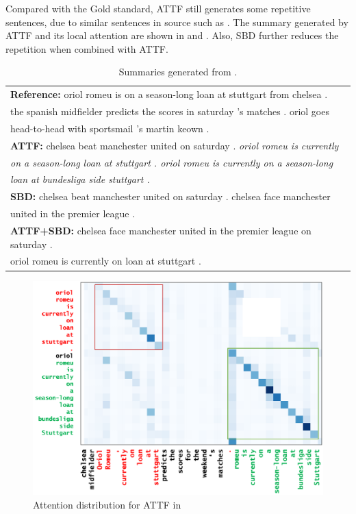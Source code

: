 Compared with the Gold standard,
ATTF still generates some repetitive sentences,
due to similar sentences in source
such as .
The summary generated by ATTF and its local attention are
shown in  and .
Also, SBD further reduces the repetition when combined with ATTF. 

\begin{table}[th!]
\begin{center}
\scriptsize
\begin{tabular}{|l|}%
\hline \textbf{Reference:} oriol romeu is on a season-long loan at stuttgart from chelsea . \\
       the spanish midfielder predicts the scores in saturday 's matches . oriol goes \\
	   head-to-head with sportsmail 's martin keown .\\
\hline \textbf{ATTF:} chelsea beat manchester united on saturday . \textit{oriol romeu is currently} \\
       \textit{on a season-long loan at stuttgart . oriol romeu is currently on a season-long} \\
	   \textit{loan at bundesliga side stuttgart .}\\
\hline \textbf{SBD:} chelsea beat manchester united on saturday . chelsea face manchester \\
       united in the premier league . \\ 
\hline \textbf{ATTF+SBD:} chelsea face manchester united in the premier league on saturday . \\
       oriol romeu is currently on loan at stuttgart . \\
\hline
\end{tabular}
\end{center}
\caption{Summaries generated from .}
\label{tab:src_rep}
\end{table}

\begin{figure}[th!]
\centering
\includegraphics[width=0.84\columnwidth]{map3}
\caption{Attention distribution for ATTF in }
\label{fig:attn_map3}
\end{figure}


